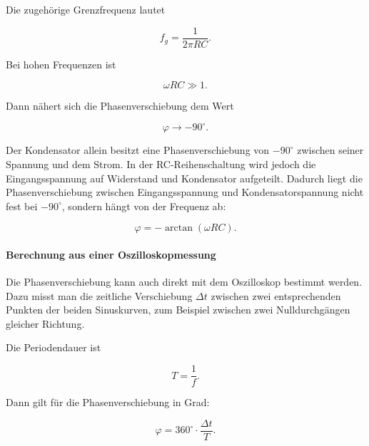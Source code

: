 Die zugehörige Grenzfrequenz lautet

\begin{equation}
	f_g
	=
	\frac{1}{2\pi RC}.
	\label{eq:rc-grenzfrequenz-phase}
\end{equation}

Bei hohen Frequenzen ist

\begin{equation}
	\omega RC \gg 1.
	\label{eq:rc-phase-hohe-frequenz}
\end{equation}

Dann nähert sich die Phasenverschiebung dem Wert

\begin{equation}
	\varphi \rightarrow -90^\circ.
	\label{eq:rc-phase-hohe-frequenz-grenzwert}
\end{equation}

\begin{DidacticBox}
	\label{box:rc-warum-nicht-immer-90-grad}
	Der Kondensator allein besitzt eine Phasenverschiebung von \(-90^\circ\)
	zwischen seiner Spannung und dem Strom. In der RC-Reihenschaltung wird jedoch
	die Eingangsspannung auf Widerstand und Kondensator aufgeteilt. Dadurch liegt
	die Phasenverschiebung zwischen Eingangsspannung und Kondensatorspannung nicht
	fest bei \(-90^\circ\), sondern hängt von der Frequenz ab:
	
	\[
	\varphi
	=
	-\arctan(\omega RC).
	\]
\end{DidacticBox}

\paragraph{Berechnung aus einer Oszilloskopmessung}

Die Phasenverschiebung kann auch direkt mit dem Oszilloskop bestimmt werden.
Dazu misst man die zeitliche Verschiebung \(\Delta t\) zwischen zwei
entsprechenden Punkten der beiden Sinuskurven, zum Beispiel zwischen zwei
Nulldurchgängen gleicher Richtung.

Die Periodendauer ist

\begin{equation}
	T=\frac{1}{f}.
	\label{eq:rc-periodendauer}
\end{equation}

Dann gilt für die Phasenverschiebung in Grad:

\begin{equation}
	\varphi
	=
	360^\circ \cdot \frac{\Delta t}{T}.
	\label{eq:rc-phase-oszilloskop-grad}
\end{equation}


